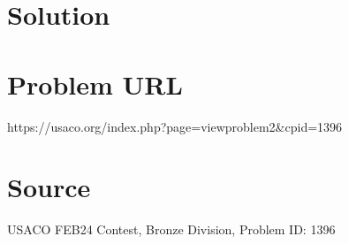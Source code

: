 \documentclass[12pt]{article}
\begin{document}
\section*{Solution}


\section*{Problem URL}
https://usaco.org/index.php?page=viewproblem2&cpid=1396

\section*{Source}
USACO FEB24 Contest, Bronze Division, Problem ID: 1396
\end{document}
